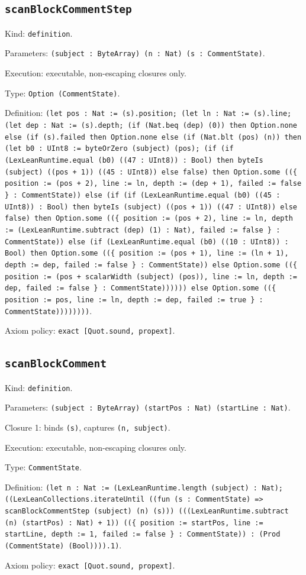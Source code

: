 \documentclass[11pt]{article}
\begin{document}
\subsection*{\texttt{scanBlockCommentStep}}
\noindent Kind: \texttt{definition}.\par
\noindent Parameters: \texttt{(subject : ByteArray) (n : Nat) (s : CommentState)}.\par
\noindent Execution: executable, non-escaping closures only.\par
\noindent Type: \texttt{Option (CommentState)}.\par
\noindent Definition: \texttt{(let pos : Nat := (s).position; (let ln : Nat := (s).line; (let dep : Nat := (s).depth; (if (Nat.beq (dep) (0)) then Option.none else (if (s).failed then Option.none else (if (Nat.blt (pos) (n)) then (let b0 : UInt8 := byteOrZero (subject) (pos); (if (if (LexLeanRuntime.equal (b0) ((47 : UInt8)) : Bool) then byteIs (subject) ((pos + 1)) ((45 : UInt8)) else false) then Option.some ((\{ position := (pos + 2), line := ln, depth := (dep + 1), failed := false \} : CommentState)) else (if (if (LexLeanRuntime.equal (b0) ((45 : UInt8)) : Bool) then byteIs (subject) ((pos + 1)) ((47 : UInt8)) else false) then Option.some ((\{ position := (pos + 2), line := ln, depth := (LexLeanRuntime.subtract (dep) (1) : Nat), failed := false \} : CommentState)) else (if (LexLeanRuntime.equal (b0) ((10 : UInt8)) : Bool) then Option.some ((\{ position := (pos + 1), line := (ln + 1), depth := dep, failed := false \} : CommentState)) else Option.some ((\{ position := (pos + scalarWidth (subject) (pos)), line := ln, depth := dep, failed := false \} : CommentState)))))) else Option.some ((\{ position := pos, line := ln, depth := dep, failed := true \} : CommentState))))))))}.\par
\noindent Axiom policy: \texttt{exact [Quot.sound, propext]}.\par
\subsection*{\texttt{scanBlockComment}}
\noindent Kind: \texttt{definition}.\par
\noindent Parameters: \texttt{(subject : ByteArray) (startPos : Nat) (startLine : Nat)}.\par
\noindent Closure 1: binds \texttt{(s)}, captures \texttt{(n, subject)}.\par
\noindent Execution: executable, non-escaping closures only.\par
\noindent Type: \texttt{CommentState}.\par
\noindent Definition: \texttt{(let n : Nat := (LexLeanRuntime.length (subject) : Nat); ((LexLeanCollections.iterateUntil ((fun (s : CommentState) => scanBlockCommentStep (subject) (n) (s))) (((LexLeanRuntime.subtract (n) (startPos) : Nat) + 1)) ((\{ position := startPos, line := startLine, depth := 1, failed := false \} : CommentState)) : (Prod (CommentState) (Bool)))).1)}.\par
\noindent Axiom policy: \texttt{exact [Quot.sound, propext]}.\par
\end{document}
